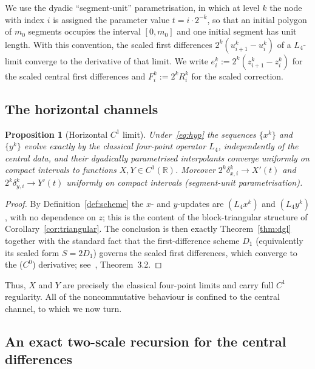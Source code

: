 \documentclass{article}
\theoremstyle{plain}
\newtheorem{proposition}[theorem]{Proposition}
\theoremstyle{definition}
\newcommand{\R}{\mathbb{R}}
\newcommand{\Lop}{L_4}
\begin{document}
We use the dyadic ``segment-unit'' parametrisation, in which at level $k$ the node with
index $i$ is assigned the parameter value $t=i\cdot 2^{-k}$, so that an initial
polygon of $m_0$ segments occupies the interval $[0,m_0]$ and one initial
segment has unit length. With this convention, the scaled first differences
$2^k(u_{i+1}^k-u_i^k)$ of a $\Lop$-limit converge to the derivative of that
limit. We write $e_i^k:=2^k(z_{i+1}^k-z_i^k)$ for the scaled central first
differences and $F_i^k:=2^k R_i^k$ for the scaled correction.

\subsection{The horizontal channels}\label{sec:horizontal}

\begin{proposition}[Horizontal $C^1$ limit]\label{prop:horizontal}
Under~\eqref{eq:hyp} the sequences $\{x^k\}$ and $\{y^k\}$ evolve exactly by
the classical four-point operator $\Lop$, independently of the central data,
and their dyadically parametrised interpolants converge uniformly on compact
intervals to functions $X,Y\in C^1(\R)$. Moreover
$2^k\delta_{x,i}^k\to X'(t)$ and $2^k\delta_{y,i}^k\to Y'(t)$ uniformly on
compact intervals (segment-unit parametrisation).
\end{proposition}

\begin{proof}
By Definition~\ref{def:scheme} the $x$- and $y$-updates are $(\Lop x^k)$ and
$(\Lop y^k)$, with no dependence on $z$; this is the content of the
block-triangular structure of Corollary~\ref{cor:triangular}. The conclusion
is then exactly Theorem~\ref{thm:dgl} together with the standard fact that the
first-difference scheme $D_1$ (equivalently its scaled form $S=2D_1$) governs the
scaled first differences, which converge to the ($C^0$) derivative;
see~\cite{Dyn92}, Theorem~3.2.
\end{proof}

Thus, $X$ and $Y$ are precisely the classical four-point limits and carry full
$C^1$ regularity. All of the noncommutative behaviour is confined to the
central channel, to which we now turn.

\subsection{An exact two-scale recursion for the central differences}\label{sec:recursion}
\end{document}
